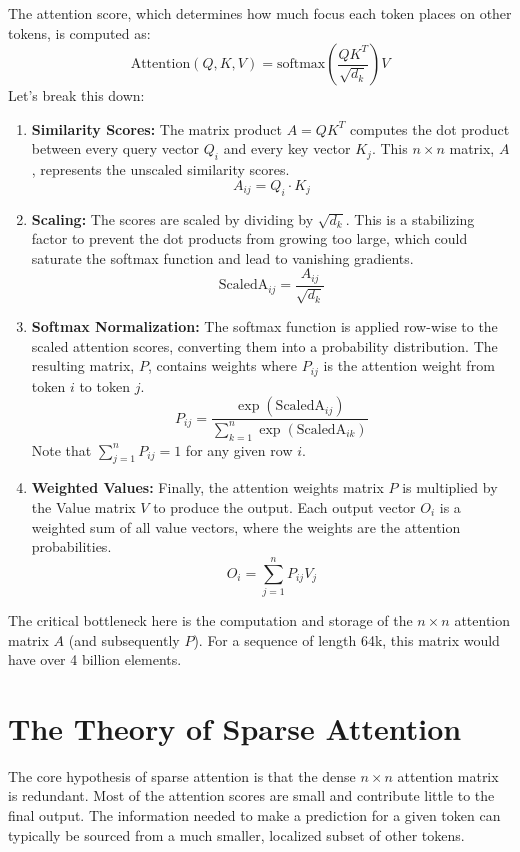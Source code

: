 \documentclass{article}
\begin{document}
The attention score, which determines how much focus each token places on other tokens, is computed as:
\[
\text{Attention}(Q, K, V) = \text{softmax}\left(\frac{QK^T}{\sqrt{d_k}}\right)V
\]
Let's break this down:
\begin{enumerate}
    \item \textbf{Similarity Scores:} The matrix product \(A = QK^T\) computes the dot product between every query vector \(Q_i\) and every key vector \(K_j\). This \(n \times n\) matrix, \(A\), represents the unscaled similarity scores.
    \[
    A_{ij} = Q_i \cdot K_j
    \]

    \item \textbf{Scaling:} The scores are scaled by dividing by \(\sqrt{d_k}\). This is a stabilizing factor to prevent the dot products from growing too large, which could saturate the softmax function and lead to vanishing gradients.
    \[
    \text{ScaledA}_{ij} = \frac{A_{ij}}{\sqrt{d_k}}
    \]

    \item \textbf{Softmax Normalization:} The softmax function is applied row-wise to the scaled attention scores, converting them into a probability distribution. The resulting matrix, \(P\), contains weights where \(P_{ij}\) is the attention weight from token \(i\) to token \(j\).
    \[
    P_{ij} = \frac{\exp(\text{ScaledA}_{ij})}{\sum_{k=1}^{n} \exp(\text{ScaledA}_{ik})}
    \]
    Note that \(\sum_{j=1}^{n} P_{ij} = 1\) for any given row \(i\).

    \item \textbf{Weighted Values:} Finally, the attention weights matrix \(P\) is multiplied by the Value matrix \(V\) to produce the output. Each output vector \(O_i\) is a weighted sum of all value vectors, where the weights are the attention probabilities.
    \[
    O_i = \sum_{j=1}^{n} P_{ij} V_j
    \]
\end{enumerate}
The critical bottleneck here is the computation and storage of the \(n \times n\) attention matrix \(A\) (and subsequently \(P\)). For a sequence of length 64k, this matrix would have over 4 billion elements.

\section{The Theory of Sparse Attention}

The core hypothesis of sparse attention is that the dense \(n \times n\) attention matrix is redundant. Most of the attention scores are small and contribute little to the final output. The information needed to make a prediction for a given token can typically be sourced from a much smaller, localized subset of other tokens.
\end{document}
